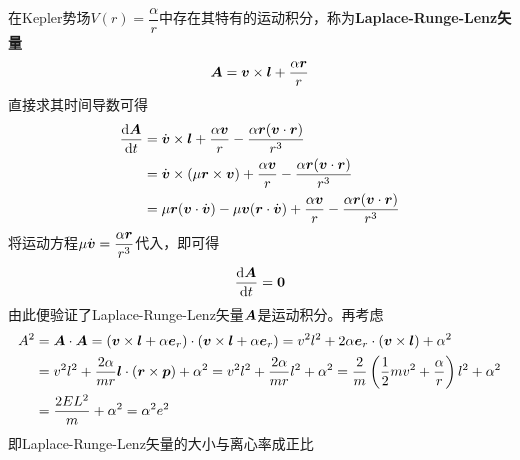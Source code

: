 在Kepler势场$V(r) = \dfrac{\alpha}{r}$中存在其特有的运动积分，称为{\bf Laplace-Runge-Lenz矢量}
\begin{equation}
	\boldsymbol{A} = \boldsymbol{v} \times \boldsymbol{l} + \frac{\alpha \boldsymbol{r}}{r}
\end{equation}
直接求其时间导数可得
\begin{align*}
	\frac{\mathrm{d}\boldsymbol{A}}{\mathrm{d}t} & = \dot{\boldsymbol{v}} \times \boldsymbol{l} + \frac{\alpha \boldsymbol{v}}{r} - \frac{\alpha \boldsymbol{r}(\boldsymbol{v}\cdot \boldsymbol{r})}{r^3} \\
	& = \dot{\boldsymbol{v}} \times (\mu \boldsymbol{r} \times \boldsymbol{v}) + \frac{\alpha \boldsymbol{v}}{r} - \frac{\alpha \boldsymbol{r}(\boldsymbol{v}\cdot \boldsymbol{r})}{r^3} \\
	& = \mu\boldsymbol{r}(\boldsymbol{v}\cdot\dot{\boldsymbol{v}}) - \mu\boldsymbol{v}(\boldsymbol{r}\cdot \dot{\boldsymbol{v}}) + \frac{\alpha \boldsymbol{v}}{r} - \frac{\alpha \boldsymbol{r}(\boldsymbol{v}\cdot \boldsymbol{r})}{r^3}
\end{align*}
将运动方程$\mu \dot{\boldsymbol{v}} = \dfrac{\alpha\boldsymbol{r}}{r^3}$代入，即可得
\begin{equation*}
	\frac{\mathrm{d}\boldsymbol{A}}{\mathrm{d}t} = \boldsymbol{0}
\end{equation*}
由此便验证了Laplace-Runge-Lenz矢量$\boldsymbol{A}$是运动积分。再考虑
\begin{align*}
	A^2 & = \boldsymbol{A} \cdot \boldsymbol{A} = \left(\boldsymbol{v} \times \boldsymbol{l} + \alpha \boldsymbol{e}_r\right) \cdot \left(\boldsymbol{v} \times \boldsymbol{l} + \alpha \boldsymbol{e}_r\right) = v^2 l^2 + 2\alpha \boldsymbol{e}_r \cdot (\boldsymbol{v} \times \boldsymbol{l}) + \alpha^2 \\
	& = v^2 l^2 + \frac{2\alpha}{mr} \boldsymbol{l} \cdot (\boldsymbol{r} \times \boldsymbol{p}) + \alpha^2 = v^2 l^2 + \frac{2\alpha}{mr} l^2 + \alpha^2 = \frac{2}{m}\left(\frac12 mv^2 + \frac{\alpha}{r}\right) l^2 + \alpha^2 \\
	& = \frac{2EL^2}{m} + \alpha^2 = \alpha^2 e^2
\end{align*}
即Laplace-Runge-Lenz矢量的大小与离心率成正比

